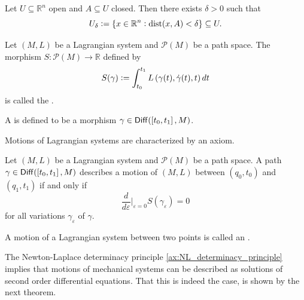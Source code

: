 \begin{exercise}
	\label{ex:U_delta_neighbourhood}
	Let $U \subseteq \mathbb{R}^n$ open and $A \subseteq U$ closed. Then there exists $\delta > 0$ such that
	\begin{equation*}
		U_\delta := \cbr[0]{x \in \mathbb{R}^n : \dist(x,A) < \delta} \subseteq U.
	\end{equation*}
\end{exercise}

\begin{definition}
	Let $(M,L)$ be a Lagrangian system and $\mathcal{P}(M)$ be a path space. The morphism $S : \mathcal{P}(M) \to \mathbb{R}$ defined by
	\begin{equation*}
		S(\gamma) := \int_{t_0}^{t_1} L\del[0]{\gamma(t),\dot{\gamma}(t),t} dt
	\end{equation*}
	\noindent is called the .
\end{definition}

\begin{definition}
	A  is defined to be a morphism $\gamma \in \mathsf{Diff}(\intcc[0]{t_0,t_1},M)$.
\end{definition}

Motions of Lagrangian systems are characterized by an axiom.

\begin{axiom}
	\label{ax:Hamilton_least_action}
	Let $(M,L)$ be a Lagrangian system and $\mathcal{P}(M)$ be a path space. A path $\gamma \in \mathsf{Diff}(\intcc[0]{t_0,t_1},M)$ describes a motion of $(M,L)$ between $(q_0,t_0)$ and $(q_1,t_1)$ if and only if 
	\begin{equation}
		\frac{d}{d\varepsilon}\bigg\vert_{\varepsilon = 0} S(\gamma_\varepsilon) = 0
	\end{equation}
	\noindent for all variations $\gamma_\varepsilon$ of $\gamma$.
\end{axiom}

\begin{definition}[Extremal]
	A motion of a Lagrangian system between two points is called an .
\end{definition}

The Newton-Laplace determinacy principle \ref{ax:NL_determinacy_principle} implies that motions of mechanical systems can be described as solutions of second order differential equations. That this is indeed the case, is shown by the next theorem.

